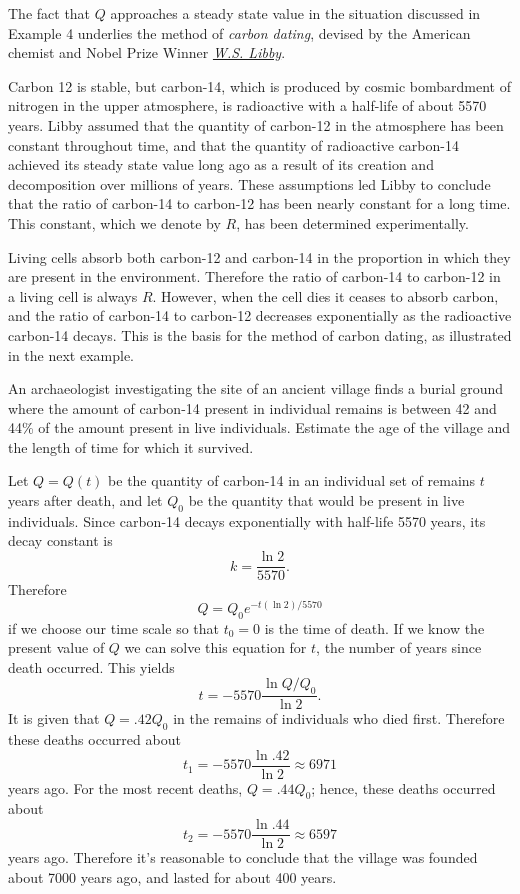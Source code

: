
\noindent
The fact that $Q$ approaches a steady state value in the situation discussed in Example 4 underlies
the method of {\color{blue}\it carbon dating}, devised by the American chemist and Nobel Prize
Winner
\href{https://www.nobelprize.org/uploads/2018/06/libby-lecture.pdf}{\color{blue}
\it W.S. Libby}.

Carbon 12 is stable, but carbon-14, which is produced by cosmic bombardment of nitrogen in the upper
atmosphere, is radioactive with a half-life of about 5570 years. Libby assumed that the quantity of
carbon-12 in the atmosphere has been constant throughout time, and that the quantity of radioactive
carbon-14 achieved its steady state value long ago as a result of its creation and decomposition
over millions of years. These assumptions led Libby to conclude that the ratio of carbon-14 to
carbon-12 has been nearly constant for a long time. This constant, which we denote by $R$, has been
determined experimentally.

Living cells absorb both carbon-12 and carbon-14 in the proportion in which they are present in the
environment. Therefore the ratio of carbon-14 to carbon-12 in a living cell is always $R$. However,
when the cell dies it ceases to absorb carbon, and the ratio of carbon-14 to carbon-12 decreases
exponentially as the radioactive carbon-14 decays. This is the basis for the method of carbon
dating, as illustrated in the next example.

\begin{example}
  \label{example:4.1.5} \rm An archaeologist investigating the site of an ancient village finds a
  burial ground where the amount of carbon-14 present in individual remains is between 42 and 44\%
  of the amount present in live individuals. Estimate the age of the village and the length of time
  for which it survived.
\end{example}

\begin{examplesolution}
\solution Let $Q=Q(t)$ be the quantity of carbon-14 in an individual set of remains $t$ years after
death, and let $Q_{0}$ be the quantity that would be present in live individuals. Since carbon-14
decays exponentially with half-life 5570 years, its decay constant is
\[
  k=\frac{\ln2}{5570}.
\]
Therefore
\[
  Q=Q_{0}e^{-t(\ln2)/5570}
\]
if we choose our time scale so that $t_{0}=0$ is the time of death. If we know the present value of
$Q$ we can solve this equation for $t$, the number of years since death occurred. This yields
\[
  t=-5570{\frac{\ln Q/Q_{0}}{\ln2}}.
\]
It is given that $Q=.42Q_{0}$ in the remains of individuals who died first. Therefore these deaths
occurred about
\[
  t_{1}=-5570{\frac{\ln.42}{\ln2}}\approx6971
\]
years ago. For the most recent deaths, $Q=.44 Q_{0}$; hence, these deaths occurred about
\[
  t_{2}=-5570{\frac{\ln.44}{\ln2}}\approx6597
\]
years ago. Therefore it's reasonable to conclude that the village was founded about 7000 years ago,
and lasted for about 400 years.
\end{examplesolution}


